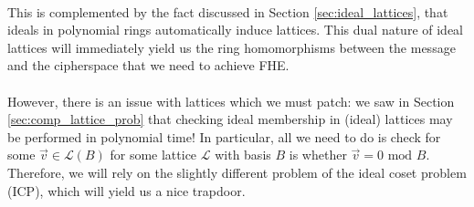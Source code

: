 \documentclass{article}
\theoremstyle{definition}
\theoremstyle{example}
\renewcommand{\L}{\mathcal{L}}
\renewcommand{\mod}{\,\,\text{mod}\,\,}
\begin{document}
\paragraph{} This is complemented by the fact discussed in Section
\ref{sec:ideal_lattices}, that ideals in polynomial rings automatically
induce lattices. This dual nature of ideal lattices will immediately yield us
the ring homomorphisms between the message and the cipherspace that we need to
achieve FHE.
\paragraph{} However, there is an issue with lattices which we must patch: we
saw in Section \ref{sec:comp_lattice_prob} that checking ideal membership in
(ideal) lattices may be performed in polynomial time! In particular, all we need
to do is check for some $\vec{v} \in \L(B)$ for some lattice $\L$ with basis $B$
is whether $\vec{v} = 0 \mod B$. Therefore, we will rely on the slightly
different problem of the ideal coset problem (ICP), which will yield us a nice trapdoor.
\end{document}
